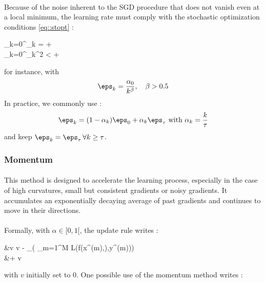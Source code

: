 \documentclass[a4paper]{article}
\begin{document}
{{{				\paragraph{} Because of the noise inherent to the SGD procedure that does not vanish even at a local minimum, the learning rate must comply with the stochastic optimization conditions \eqref{eq::stopt} :
				{
					\label{eq::stopt}
					\begin{aligned}
						\sum_{k=0}^\infty \eps_k = +\infty \\
						\sum_{k=0}^\infty \eps_k^2 < +\infty
					\end{aligned}
				}
				for instance, with 
				\begin{equation}
					\eps_k = \frac{\alpha_0}{k^\beta}, \quad \beta > 0.5
				\end{equation}
				In practice, we commonly use : 
				\begin{equation}
					\eps_k = (1-\alpha_k)\eps_0 + \alpha_k \eps_\tau \text{ with } \alpha_k = \frac{k}{\tau}
				\end{equation}
				and keep $\eps_k = \eps_\tau\, \forall k\geq \tau$. 
			}
			\subsubsection{Momentum}
			{
				\paragraph{} This method is designed to accelerate the learning process, especially in the case of high curvatures, small but consistent gradients or noisy gradients. It accumulates an exponentially decaying average of past gradients and continues to move in their directions. 
				
				\paragraph{} Formally, with $\alpha\in[0,1[$, the update rule writes : 
				\boxedeq{red}
				{
					\begin{aligned}
						&v \leftarrow \alpha v - \eps \cdot \nabla_\theta\left( \sum_{m=1}^M L(f(x^{(m)},\theta),y^{(m)})\right) \\
						&\theta \leftarrow \theta + v 
					\end{aligned}
				}
				with $v$ initially set to $0$. One possible use of the momentum method writes : 
				\vspace{10pt}
			
}}}
\end{document}
